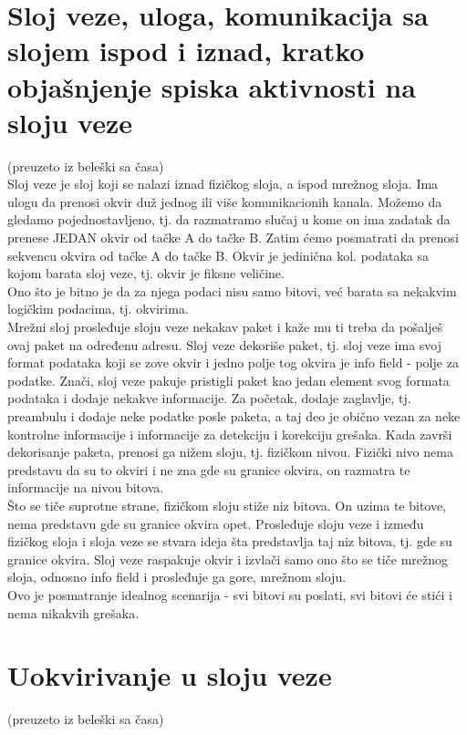 \documentclass{article} %
\begin{document}
\section{Sloj veze, uloga, komunikacija sa slojem ispod i iznad, kratko objašnjenje spiska aktivnosti na sloju veze}
(preuzeto iz beleški sa časa)\\

Sloj veze je sloj koji se nalazi iznad fizičkog sloja, a ispod mrežnog sloja. Ima ulogu da prenosi okvir duž jednog ili više komunikacionih kanala. Možemo da gledamo pojednostavljeno, tj. da razmatramo slučaj u kome on ima zadatak da prenese JEDAN okvir od tačke A do tačke B. Zatim ćemo posmatrati da prenosi sekvencu okvira od tačke A do tačke B. Okvir je jedinična kol. podataka sa kojom barata sloj veze, tj. okvir je fiksne veličine.\\
Ono što je bitno je da za njega podaci nisu samo bitovi, već barata sa nekakvim logičkim podacima, tj. okvirima.\\

Mrežni sloj prosleđuje sloju veze nekakav paket i kaže mu ti treba da pošalješ ovaj paket na određenu adresu. Sloj veze dekoriše paket, tj. sloj veze ima svoj format podataka koji se zove okvir i jedno polje tog okvira je info field - polje za podatke. Znači, sloj veze pakuje pristigli paket kao jedan element svog formata podataka i dodaje nekakve informacije. Za početak, dodaje zaglavlje, tj. preambulu i dodaje neke podatke posle paketa, a taj deo je obično vezan za neke kontrolne informacije i informacije za detekciju i korekciju grešaka. Kada završi dekorisanje paketa, prenosi ga nižem sloju, tj. fizičkom nivou. Fizički nivo nema predstavu da su to okviri i ne zna gde su granice okvira, on razmatra te informacije na nivou bitova. \\

Što se tiče suprotne strane, fizičkom sloju stiže niz bitova. On uzima te bitove, nema predstavu gde su granice okvira opet. Prosleđuje sloju veze i između fizičkog sloja i sloja veze se stvara ideja šta predstavlja taj niz bitova, tj. gde su granice okvira. Sloj veze raspakuje okvir i izvlači samo ono što se tiče mrežnog sloja, odnosno info field i prosleđuje ga gore, mrežnom sloju.
\\

Ovo je posmatranje idealnog scenarija - svi bitovi su poslati, svi bitovi će stići i nema nikakvih grešaka.
\section{Uokvirivanje u sloju veze}
(preuzeto iz beleški sa časa)\\
\end{document}
